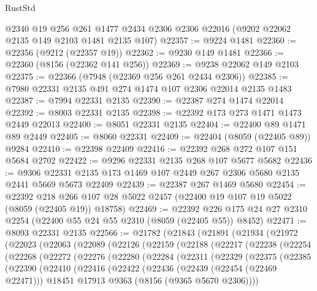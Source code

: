 \begin{lexlean}{RustStd}
\begin{coremodule}
    @2340
    @19
    @256
    @261
    @1477
    @2434
    @2306
    @2306
    @22016
    (@9202 @22062 @2135 @149 @2103 @1481 @2135 @107)
@22357 := @9224 @1481
@22360 := @22356 (@9212 (@22357 @19))
@22362 := @9230 @149 @1481
@22366 := @22360 (@8156 (@22362 @141 @256))
@22369 := @9238 @22062 @149 @2103
@22375 := @22366 (@7948 (@22369 @256 @261 @2434 @2306))
@22385 := @7980 @22331 @2135 @491 @274 @1474 @107 @2306 @22014 @2135 @1483
@22387 := @7994 @22331 @2135
@22390 := @22387 @274 @1474 @22014
@22392 := @8003 @22331 @2135
@22398 := @22392 @173 @273 @1471 @1473 @2449 @22013
@22400 := @8051 @22331 @2135
@22404 := @22400 @89 @1471 @89 @2449
@22405 := @8060 @22331
@22409 := @22404 (@8059 (@22405 @89)) @9284
@22410 := @22398 @22409
@22416 := @22392 @268 @272 @107 @151 @5684 @2702
@22422 := @9296 @22331 @2135 @268 @107 @5677 @5682
@22436 := @9306 @22331 @2135 @173 @1469 @107 @2449 @267 @2306 @5680 @2135 @2441 @5669 @5673 @22409
@22439 := @22387 @267 @1469 @5680
@22454 := @22392
    @218
    @266
    @107
    @28
    @5022
    @2457
    (@22400 @19 @107 @19 @5022 (@8059 (@22405 @19)) @18758)
@22469 := @22392 @226 @175 @24 @27 @2310 @2254 (@22400 @55 @24 @55 @2310 (@8059 (@22405 @55)) @8452)
@22471 := @8093 @22331 @2135
@22566 := @21782
    (@21843
      (@21891
        (@21934
          (@21972
            (@22023
              (@22063
                (@22089
                  (@22126
                    (@22159
                      (@22188
                        (@22217
                          (@22238
                            (@22254
                              (@22268
                                (@22272
                                  (@22276
                                    (@22280
                                      (@22284
                                        (@22311
                                          (@22329
                                            (@22375
                                              (@22385
                                                (@22390
                                                  (@22410
                                                    (@22416
                                                      (@22422
                                                        (@22436
                                                          (@22439 (@22454 (@22469 @22471)))
                                                          @18451
                                                          @17913
                                                          @9363
                                                          (@8156 (@9365 @5670 @2306))))

\end{coremodule}
\end{lexlean}
